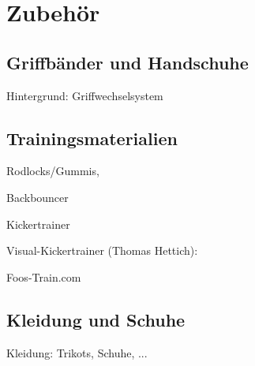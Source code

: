 \section{Zubehör}
\label{tisch:zubehoer}


\subsection{Griffbänder und Handschuhe}
\label{tisch:zubehoer:griffe}



Hintergrund: Griffwechselsystem

\subsection{Trainingsmaterialien}
\label{tisch:zubehoer:training}
Rodlocks/Gummis, 

Backbouncer

Kickertrainer 

Visual-Kickertrainer (Thomas Hettich):  %

Foos-Train.com


\subsection{Kleidung und Schuhe}
\label{tisch:zubehoer:kleidung}

Kleidung: Trikots, Schuhe, ...
